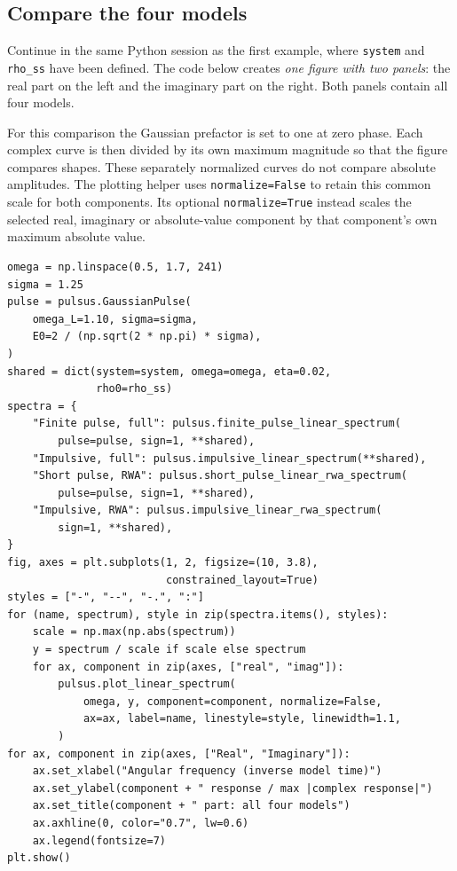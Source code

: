 \subsection{Compare the four models}

Continue in the same Python session as the first example, where
\texttt{system} and \texttt{rho\_ss} have been defined. The code below creates
\emph{one figure with two panels}: the real part on the left and the imaginary
part on the right. Both panels contain all four models.

For this comparison the Gaussian prefactor is set to one at zero phase.
Each complex curve is then divided by its own maximum magnitude so that the
figure compares shapes. These separately normalized curves do not compare
absolute amplitudes. The plotting helper uses \texttt{normalize=False}
to retain this common scale for both components. Its optional
\texttt{normalize=True} instead scales the selected real, imaginary or
absolute-value component by that component's own maximum absolute value.

\par\noindent
\begin{minipage}{\linewidth}
\begin{lstlisting}[style=python]
omega = np.linspace(0.5, 1.7, 241)
sigma = 1.25
pulse = pulsus.GaussianPulse(
    omega_L=1.10, sigma=sigma,
    E0=2 / (np.sqrt(2 * np.pi) * sigma),
)
shared = dict(system=system, omega=omega, eta=0.02,
              rho0=rho_ss)
spectra = {
    "Finite pulse, full": pulsus.finite_pulse_linear_spectrum(
        pulse=pulse, sign=1, **shared),
    "Impulsive, full": pulsus.impulsive_linear_spectrum(**shared),
    "Short pulse, RWA": pulsus.short_pulse_linear_rwa_spectrum(
        pulse=pulse, sign=1, **shared),
    "Impulsive, RWA": pulsus.impulsive_linear_rwa_spectrum(
        sign=1, **shared),
}
fig, axes = plt.subplots(1, 2, figsize=(10, 3.8),
                         constrained_layout=True)
styles = ["-", "--", "-.", ":"]
for (name, spectrum), style in zip(spectra.items(), styles):
    scale = np.max(np.abs(spectrum))
    y = spectrum / scale if scale else spectrum
    for ax, component in zip(axes, ["real", "imag"]):
        pulsus.plot_linear_spectrum(
            omega, y, component=component, normalize=False,
            ax=ax, label=name, linestyle=style, linewidth=1.1,
        )
for ax, component in zip(axes, ["Real", "Imaginary"]):
    ax.set_xlabel("Angular frequency (inverse model time)")
    ax.set_ylabel(component + " response / max |complex response|")
    ax.set_title(component + " part: all four models")
    ax.axhline(0, color="0.7", lw=0.6)
    ax.legend(fontsize=7)
plt.show()
\end{lstlisting}
\end{minipage}\par

